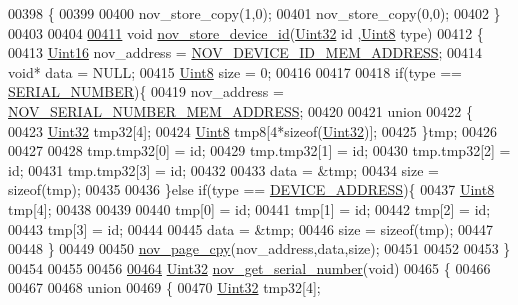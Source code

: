 \begin{DoxyCode}
00398 \{
00399 
00400      nov\_store\_copy(1,0);
00401      nov\_store\_copy(0,0);
00402 \}
00403 
00404 
\hypertarget{a00060_source_l00411}{}\hyperlink{a00060_a9aa94b184db1bd55b6a4a61a34c14c8d}{00411} \textcolor{keywordtype}{void}   \hyperlink{a00060_a9aa94b184db1bd55b6a4a61a34c14c8d}{nov\_store\_device\_id}(\hyperlink{a00072_aba99025e657f892beb7ff31cecf64653}{Uint32} \textcolor{keywordtype}{id} ,\hyperlink{a00072_af84840501dec18061d18a68c162a8fa2}{Uint8} type)
00412 \{
00413     \hyperlink{a00072_a59a9f6be4562c327cbfb4f7e8e18f08b}{Uint16}       nov\_address = \hyperlink{a00029_a3ddbe5b40319c96bfe46429e902f8d33}{NOV\_DEVICE\_ID\_MEM\_ADDRESS};
00414     \textcolor{keywordtype}{void}*        data = NULL;
00415     \hyperlink{a00072_af84840501dec18061d18a68c162a8fa2}{Uint8}        size = 0;
00416 
00417 
00418     \textcolor{keywordflow}{if}(type == \hyperlink{a00029_ad8a20d143f6a7579ed227578aeddec21}{SERIAL\_NUMBER})\{
00419     nov\_address = \hyperlink{a00029_ab7dc1ea8a7f6e16cf27fbfe88efd7285}{NOV\_SERIAL\_NUMBER\_MEM\_ADDRESS};
00420 
00421     \textcolor{keyword}{union}
00422     \{
00423         \hyperlink{a00072_aba99025e657f892beb7ff31cecf64653}{Uint32} tmp32[4];
00424         \hyperlink{a00072_af84840501dec18061d18a68c162a8fa2}{Uint8}  tmp8[4*\textcolor{keyword}{sizeof}(\hyperlink{a00072_aba99025e657f892beb7ff31cecf64653}{Uint32})];
00425     \}tmp;
00426 
00427 
00428     tmp.tmp32[0] = id;
00429     tmp.tmp32[1] = id;
00430     tmp.tmp32[2] = id;
00431     tmp.tmp32[3] = id;
00432     
00433     data = &tmp;
00434     size = \textcolor{keyword}{sizeof}(tmp);
00435 
00436     \}\textcolor{keywordflow}{else} \textcolor{keywordflow}{if}(type == \hyperlink{a00029_a457be1c5e5fee67ed7d01f5887c2d656}{DEVICE\_ADDRESS})\{
00437        \hyperlink{a00072_af84840501dec18061d18a68c162a8fa2}{Uint8}  tmp[4];
00438 
00439 
00440         tmp[0] = id;
00441         tmp[1] = id;
00442         tmp[2] = id;
00443         tmp[3] = id;
00444 
00445         data = &tmp;
00446         size = \textcolor{keyword}{sizeof}(tmp);
00447 
00448     \}
00449  
00450     \hyperlink{a00060_aeb021b0e002db120ad733c24f3e179bc}{nov\_page\_cpy}(nov\_address,data,size);
00451 
00452     
00453 \}
00454 
00455 
00456 
\hypertarget{a00060_source_l00464}{}\hyperlink{a00060_a86b863ea185628aff5a00b4defbbb6e1}{00464} \hyperlink{a00072_aba99025e657f892beb7ff31cecf64653}{Uint32} \hyperlink{a00060_a86b863ea185628aff5a00b4defbbb6e1}{nov\_get\_serial\_number}(\textcolor{keywordtype}{void})
00465 \{
00466 
00467 
00468     \textcolor{keyword}{union}
00469     \{
00470         \hyperlink{a00072_aba99025e657f892beb7ff31cecf64653}{Uint32} tmp32[4];

\end{DoxyCode}

